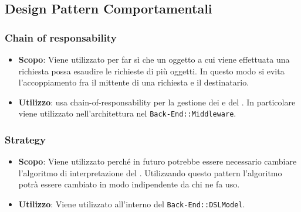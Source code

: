 \subsection{Design Pattern Comportamentali}

\subsubsection{Chain of responsability}
\label{chain-of-responsability}

\begin{itemize}

	\item \textbf{Scopo}: Viene utilizzato per far sì che un oggetto a cui viene effettuata una richiesta possa esaudire le richieste di più oggetti. In questo modo si evita l'accoppiamento fra il mittente di una richiesta e il destinatario.
	\item \textbf{Utilizzo}:  usa chain-of-responsability per la gestione dei  e del . In particolare viene utilizzato nell'architettura nel  \texttt{Back-End::Middleware}.

\end{itemize}

\subsubsection{Strategy}

\begin{itemize}

	\item \textbf{Scopo}: Viene utilizzato perché in futuro potrebbe essere necessario cambiare l'algoritmo di interpretazione del . Utilizzando questo pattern l'algoritmo potrà essere cambiato in modo indipendente da chi ne fa uso.
	\item \textbf{Utilizzo}: Viene utilizzato all'interno del  \texttt{Back-End::DSLModel}.

\end{itemize}